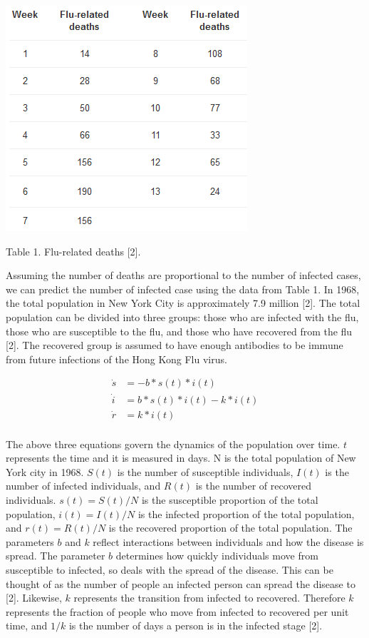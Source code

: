 \documentclass{article}
\begin{document}
\begin{center}
\includegraphics{table1.PNG}
\end{center}
\begin{center}
Table 1. Flu-related deaths [2].
\end{center}

Assuming the number of deaths are proportional to the number of infected cases, we can predict the number of infected case using the data from Table 1. In 1968, the total population in New York City is approximately 7.9 million [2]. The total population can be divided into three groups: those who are infected with the flu, those who are susceptible to the flu, and those who have recovered from the flu [2]. The recovered group is assumed to have enough antibodies to be immune from future infections of the Hong Kong Flu virus.

\begin{align*}
    \dot{s} &= -b*s(t)*i(t)  \\
    \dot{i} &= b*s(t)*i(t)-k*i(t) \\
    \dot{r} &= k*i(t) \\
\end{align*}

The above three equations govern the dynamics of the population over time. $t$ represents the time and it is measured in days. N is the total population of New York city in 1968. $S(t)$ is the number of susceptible individuals, $I(t)$ is the number of infected individuals, and $R(t)$ is the number of recovered individuals. $s(t) = S(t)/N$ is the susceptible proportion of the total population, $i(t) = I(t)/N$ is the infected proportion of the total population, and $r(t) = R(t)/N$ is the recovered proportion of the total population. The parameters $b$ and $k$ reflect interactions between individuals and how the disease is spread.  The parameter $b$ determines how quickly individuals move from susceptible to infected, so deals with the spread of the disease. This can be thought of as the number of people an infected person can spread the disease to [2]. Likewise, $k$ represents the transition from infected to recovered.  Therefore $k$ represents the fraction of people who move from infected to recovered per unit time, and $1/k$ is the number of days a person is in the infected stage [2].  
\end{document}
